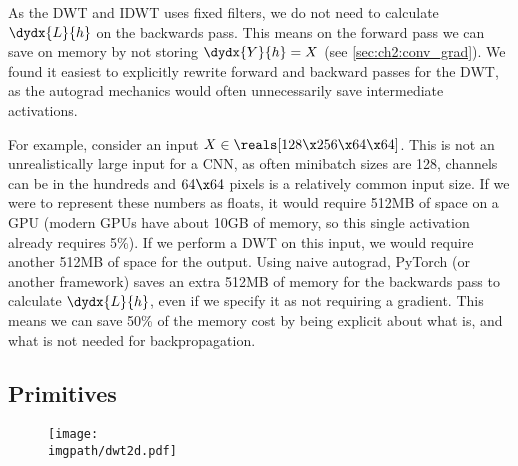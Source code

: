 As the DWT and IDWT uses fixed filters, we do not need to calculate
$\dydx{L}{h}$ on the backwards pass. This means on the forward pass we
can save on memory by not storing $\dydx{Y}{h} = X$ (see
\autoref{sec:ch2:conv_grad}). We found it easiest to explicitly rewrite forward
and backward passes for the DWT, as the autograd mechanics would often
unnecessarily save intermediate activations.

For example, consider an input $X \in \reals[128\x 256\x 64\x 64]$. This is not
an unrealistically large input for a CNN, as often minibatch sizes are 128,
channels can be in the hundreds and $64\x 64$ pixels is a relatively common 
input size. If we were to represent these numbers as floats, it would require
512MB of space on a GPU (modern GPUs have about 10GB of memory, so this single
activation already requires 5\%). If we perform a DWT on this input, we would
require another 512MB of space for the output. Using naive autograd, PyTorch
(or another framework) saves an extra 512MB of memory for the backwards pass
to calculate $\dydx{L}{h}$, even if we specify it as not requiring a gradient.
This means we can save 50\% of the memory cost by being explicit about what is,
and what is not needed for backpropagation.



\subsection{Primitives}\label{sec:ch3:primitives}
\begin{figure}
  \centering
  \texttt{[image: \\imgpath/dwt2d.pdf]}
  \label{fig:ch3:dwt}
\end{figure}

